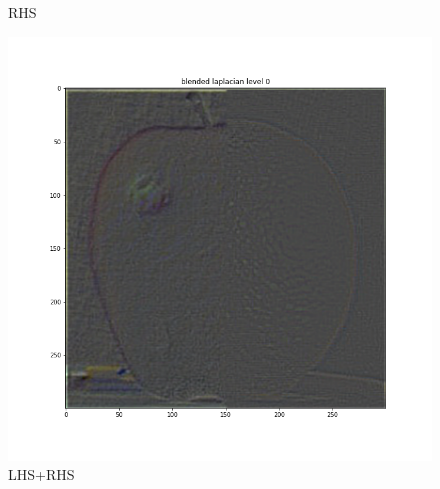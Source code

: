 \documentclass{article}
\begin{document}
\begin{figure}[!htb]
    \caption{RHS}
\endminipage
{}
    \includegraphics[width=\linewidth]{blended laplacian level 0.png}
    \caption{LHS+RHS}
\endminipage
\end{figure}
\end{document}
